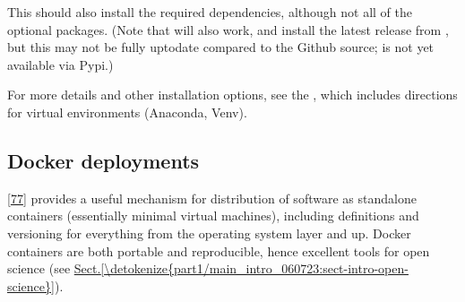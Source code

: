 \documentclass[letterpaper,table,10pt,english]{jupyterBook}
\begin{document}
\begin{sphinxVerbatim}[commandchars=\\\{\}]
  
  

\end{sphinxVerbatim}

\sphinxAtStartPar
This should also install the required dependencies, although not all of the optional packages. (Note that  will also work, and install the latest release from , but this may not be fully up\sphinxhyphen{}to\sphinxhyphen{}date compared to the Github source;  is not yet available via Pypi.)

\sphinxAtStartPar
For more details and other installation options, see the , which includes directions for virtual environments (Anaconda, Venv).


\subsection{Docker deployments}
\label{\detokenize{part1/platform_intro_070723:docker-deployments}}\label{\detokenize{part1/platform_intro_070723:sect-platform-docker}}
\sphinxAtStartPar
{} {[}\hyperlink{cite.backmatter/bibliography:id586}{77}{]} provides a useful mechanism for distribution of software as stand\sphinxhyphen{}alone containers (essentially minimal virtual machines), including definitions and versioning for everything from the operating system layer and up. Docker containers are both portable and reproducible, hence excellent tools for open science (see \hyperref[\detokenize{part1/main_intro_060723:sect-intro-open-science}]{Sect.\@ \ref{\detokenize{part1/main_intro_060723:sect-intro-open-science}}}).
\end{document}
